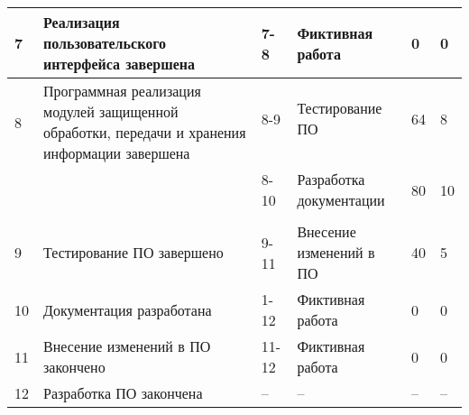 \begin{center}
\begin{longtable}[h]{| m{1cm} | m{4cm} | m{1.5cm} | m{5cm} | m{1cm} | m{1cm} |}
7 & Реализация пользовательского интерфейса завершена & 7-8 & Фиктивная работа & 0 & 0 \tabularnewline \hline

\multirow{6}{1cm}{8} & \multirow{6}{4cm}{Программная реализация модулей защищенной обработки, передачи и хранения информации завершена} & & & & \tabularnewline
 & & & & & \tabularnewline
 & & 8-9 & Тестирование ПО & 64 & 8 \tabularnewline 
 & & & & & \tabularnewline
 & & & & & \tabularnewline \cline{3-6} 
 & & & & & \tabularnewline
 & & 8-10 & Разработка документации & 80 & 10 \tabularnewline
 & & & & & \tabularnewline \hline

 9 & Тестирование ПО завершено & 9-11 & Внесение изменений в ПО & 40 & 5 \tabularnewline \hline

 10 & Документация разработана & 1-12 & Фиктивная работа & 0 & 0 \tabularnewline \hline

 11 & Внесение изменений в ПО закончено & 11-12 & Фиктивная работа & 0 & 0 \tabularnewline \hline

 12 & Разработка ПО закончена & -- & -- & -- & -- \tabularnewline \hline
\end{longtable}
\end{center}


